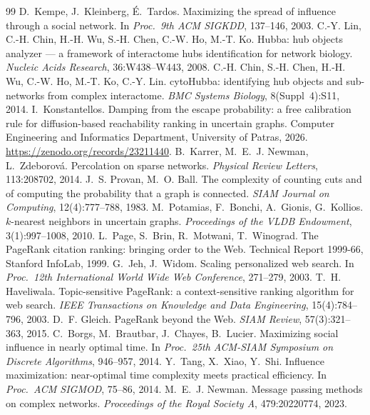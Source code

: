 \documentclass[11pt,a4paper]{article}
\theoremstyle{definition}
\theoremstyle{plain}
\begin{document}
\begin{thebibliography}{99}\footnotesize
\setlength{\itemsep}{1pt}
 D.~Kempe, J.~Kleinberg, É.~Tardos. Maximizing the spread of influence through a social network. In \emph{Proc.\ 9th ACM SIGKDD}, 137--146, 2003.
 C.-Y. Lin, C.-H. Chin, H.-H. Wu, S.-H. Chen, C.-W. Ho, M.-T. Ko. Hubba: hub objects analyzer --- a framework of interactome hubs identification for network biology. \emph{Nucleic Acids Research}, 36:W438--W443, 2008.
 C.-H. Chin, S.-H. Chen, H.-H. Wu, C.-W. Ho, M.-T. Ko, C.-Y. Lin. cytoHubba: identifying hub objects and sub-networks from complex interactome. \emph{BMC Systems Biology}, 8(Suppl~4):S11, 2014.
 I.~Konstantellos. Damping from the escape probability: a free calibration rule for diffusion-based reachability ranking in uncertain graphs. Computer Engineering and Informatics Department, University of Patras, 2026. \url{https://zenodo.org/records/23211440}.
 B.~Karrer, M.~E.~J. Newman, L.~Zdeborová. Percolation on sparse networks. \emph{Physical Review Letters}, 113:208702, 2014.
 J.~S. Provan, M.~O. Ball. The complexity of counting cuts and of computing the probability that a graph is connected. \emph{SIAM Journal on Computing}, 12(4):777--788, 1983.
 M.~Potamias, F.~Bonchi, A.~Gionis, G.~Kollios. $k$-nearest neighbors in uncertain graphs. \emph{Proceedings of the VLDB Endowment}, 3(1):997--1008, 2010.
 L.~Page, S.~Brin, R.~Motwani, T.~Winograd. The PageRank citation ranking: bringing order to the Web. Technical Report 1999-66, Stanford InfoLab, 1999.
 G.~Jeh, J.~Widom. Scaling personalized web search. In \emph{Proc.\ 12th International World Wide Web Conference}, 271--279, 2003.
 T.~H. Haveliwala. Topic-sensitive PageRank: a context-sensitive ranking algorithm for web search. \emph{IEEE Transactions on Knowledge and Data Engineering}, 15(4):784--796, 2003.
 D.~F. Gleich. PageRank beyond the Web. \emph{SIAM Review}, 57(3):321--363, 2015.
 C.~Borgs, M.~Brautbar, J.~Chayes, B.~Lucier. Maximizing social influence in nearly optimal time. In \emph{Proc.\ 25th ACM-SIAM Symposium on Discrete Algorithms}, 946--957, 2014.
 Y.~Tang, X.~Xiao, Y.~Shi. Influence maximization: near-optimal time complexity meets practical efficiency. In \emph{Proc.\ ACM SIGMOD}, 75--86, 2014.
 M.~E.~J. Newman. Message passing methods on complex networks. \emph{Proceedings of the Royal Society A}, 479:20220774, 2023.

\end{thebibliography}
\end{document}
